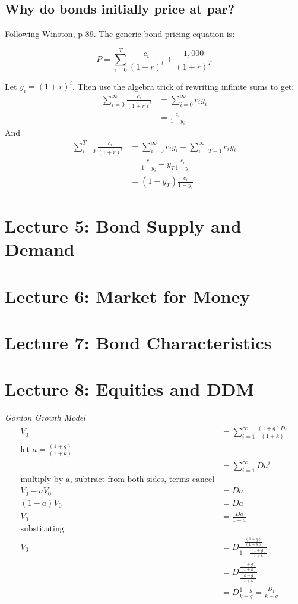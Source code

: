 \documentclass[11pt]{article}
\theoremstyle{definition}
\begin{document}
\subsection{Why do bonds initially price at par?}

Following Winston, p 89.   The generic bond pricing equation is:

$$P = \sum_{i=0}^{T}\frac{c_i}{(1+r)^t} + \frac{1,000}{(1+r)^T}$$

Let $y_i=(1+r)^i$.   Then use the algebra trick of rewriting infinite sums to get:
\begin{align*}
    \sum_{i=0}^{\infty}\frac{c_i}{(1+r)^t} &= \sum_{i=0}^{\infty}c_iy_i\\
        &= \frac{c_i}{1-y_i}    
\end{align*}
And 
\begin{align*}
    \sum_{i=0}^{T}\frac{c_i}{(1+r)^t} &= \sum_{i=0}^{\infty}c_iy_i - \sum_{i=T+1}^{\infty}c_iy_i\\
        &= \frac{c_i}{1-y_i} - y_T\frac{c_i}{1-y_i}  \\
        &= (1-y_T) \frac{c_i}{1-y_i} 
\end{align*}

\section{Lecture 5: Bond Supply and Demand}

\section{Lecture 6: Market for Money}

\section{Lecture 7: Bond Characteristics}

\section{Lecture 8: Equities and DDM}

\textit{Gordon Growth Model}
    \begin{align*}
        V_0 &= \sum_{i=1}^{\infty} \frac{(1+g)D_0}{(1+k)} \\
        \text{let } a = \frac{(1+g)}{(1+k)} \\
            &= \sum_{i=1}^{\infty} Da^i \\
        \text{multiply by a, subtract from both sides, terms cancel}\\
        V_0 - aV_0 &= Da \\
        (1-a)V_0 &= Da \\ 
        V_0 &= \frac{Da}{1-a} \\
        \text{substituting} \\
        V_0 &= D \frac{\frac{(1+g)}{(1+k)}}{1-\frac{(1+g)}{(1+k)}}\\
         &= D \frac{\frac{(1+g)}{(1+k)}}{\frac{(k-g)}{(1+k)}}\\
         &= D \frac{1+g}{k-g} = \frac{D_1}{k-g}\\
    \end{align*}
\end{document}
